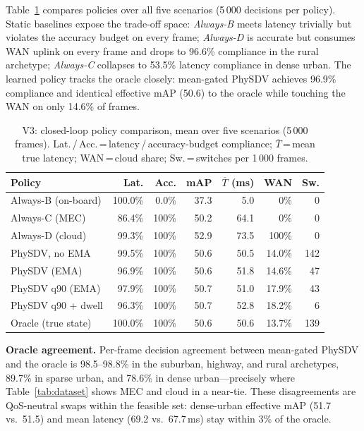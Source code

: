\documentclass[10pt,conference]{IEEEtran}
\begin{document}
Table~\ref{tab:closedloop} compares policies over all five scenarios
(5\,000 decisions per policy).  Static baselines expose the trade-off
space: \emph{Always-B} meets latency trivially but violates the accuracy
budget on every frame; \emph{Always-D} is accurate but consumes WAN
uplink on every frame and drops to 96.6\% compliance in the rural
archetype; \emph{Always-C} collapses to 53.5\% latency compliance in
dense urban.  The
learned policy tracks the oracle closely: mean-gated PhySDV achieves
96.9\% compliance and identical effective mAP (50.6) to the oracle while
touching the WAN on only 14.6\% of frames.

\begin{table}[t]
\centering
\caption{V3: closed-loop policy comparison, mean over five scenarios
(5\,000 frames).  Lat.\,/\,Acc.\,=\,latency\,/\,accuracy-budget
compliance; $\overline{T}$\,=\,mean true latency; WAN\,=\,cloud share;
Sw.\,=\,switches per 1\,000 frames.}
\label{tab:closedloop}
\scriptsize\setlength{\tabcolsep}{3.0pt}
\begin{tabular}{@{}lrrrrrr@{}}
\toprule
\textbf{Policy} & \textbf{Lat.} & \textbf{Acc.} & \textbf{mAP} &
$\overline{T}$ (ms) & \textbf{WAN} & \textbf{Sw.} \\
\midrule
Always-B (on-board)   & 100.0\% & 0.0\%   & 37.3 &  5.0 & 0\%    & 0 \\
Always-C (MEC)        & 86.4\%  & 100\% & 50.2 & 64.1 & 0\%    & 0 \\
Always-D (cloud)      & 99.3\%  & 100\% & 52.9 & 73.5 & 100\%  & 0 \\
\midrule
PhySDV, no EMA        & 99.5\%  & 100\% & 50.6 & 50.5 & 14.0\% & 142 \\
PhySDV (EMA)          & 96.9\%  & 100\% & 50.6 & 51.8 & 14.6\% & 47 \\
PhySDV q90 (EMA)      & 97.9\%  & 100\% & 50.7 & 51.0 & 17.9\% & 43 \\
PhySDV q90 + dwell    & 96.3\%  & 100\% & 50.7 & 52.8 & 18.2\% & 6 \\
\midrule
Oracle (true state)   & 100.0\% & 100\% & 50.6 & 50.6 & 13.7\% & 139 \\
\bottomrule
\end{tabular}
\end{table}

\textbf{Oracle agreement.}  Per-frame decision agreement between
mean-gated PhySDV and the oracle is 98.5--98.8\% in the suburban, highway,
and rural archetypes, 89.7\% in sparse urban, and 78.6\% in dense
urban---precisely where Table~\ref{tab:dataset} shows MEC and cloud in a
near-tie.  These disagreements are QoS-neutral swaps within the feasible
set: dense-urban effective mAP (51.7 vs.\ 51.5) and mean latency (69.2
vs.\ 67.7\,ms) stay within 3\% of the oracle.
\end{document}
